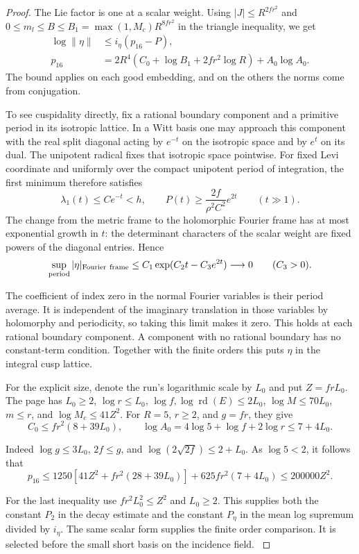 \begin{proof}
The Lie factor is one at a scalar
weight. Using \(|J|\le R^{2fr^2}\) and
\(0\le m_l\le B\le B_1=\max(1,M_c)R^{8fr^2}\) in the triangle
inequality, we get
\begin{align*}
   \log\|\eta\|&\le i_\eta(p_{16}-P),\\
   p_{16}&=2R^4(C_0+\log B_1+2fr^2\log R)+A_0\log A_0.
\end{align*}
The bound applies on each good embedding, and on the others
the norms come from conjugation.

To see cuspidality directly, fix a rational boundary component and
a primitive period in its isotropic lattice. In a Witt basis one
may approach this component with the real split diagonal acting
by \(e^{-t}\) on the isotropic space and by \(e^t\) on its dual.
The unipotent radical fixes that isotropic space pointwise.
For fixed Levi coordinate and uniformly over the compact unipotent
period of integration, the first minimum therefore satisfies
\[
 \lambda_1(t)\le C e^{-t}<h,\qquad
 P(t)\ge\frac{2f}{\rho^2 C^2}e^{2t}\qquad(t\gg1).
\] The change from
the metric frame to the holomorphic Fourier frame has at most
exponential growth in \(t\): the determinant characters of the
scalar weight are fixed powers of the diagonal entries. Hence
\[
 \sup_{\rm period}|\eta|_{\rm Fourier\ frame}
      \le C_1\exp(C_2t-C_3e^{2t})\longrightarrow0
      \qquad(C_3>0).
\]

The coefficient of index zero in the normal Fourier variables is
their period average. It is independent of the imaginary
translation in those variables by holomorphy and periodicity,
so taking this limit makes it zero. This holds at each rational
boundary component. A component with no rational boundary has
no constant-term condition. Together with the finite orders this
puts \(\eta\) in the integral cusp lattice.
\label{cor:selected-auxiliary-cusp-6}

For the explicit size, denote the run's logarithmic scale by
\(L_0\) and put \(Z=frL_0\). The page has \(L_0\ge2\),
\(\log r\le L_0\), \(\log f,\log\operatorname{rd}(E)\le 2L_0\),
\(\log M\le70L_0\), \(m\le r\), and \(\log M_c\le41Z^2\).
For \(R=5\), \(r\ge2\), and \(g=fr\), they give
\[
 C_0\le fr^2(8+39L_0),\qquad
 \log A_0=4\log5+\log f+2\log r\le7+4L_0.
\]

Indeed \(\log g\le3L_0\), \(2f\le g\), and
\(\log(2\sqrt{2f})\le2+L_0\). As \(\log5<2\), it follows that
\[
 p_{16}\le1250[41Z^2+fr^2(28+39L_0)]
             +625fr^2(7+4L_0)
        \le 200000 Z^2 .
\]

For the last inequality use \(fr^2L_0^2\le Z^2\) and
\(L_0\ge2\). This supplies both the constant \(P_2\) in the
decay estimate and the constant \(P_\eta\) in the mean
log supremum divided by \(i_\eta\). The same scalar form
supplies the finite order comparison. It is selected before
the small short basis on the incidence field.
\label{cor:selected-auxiliary-cusp-7}
\end{proof}
